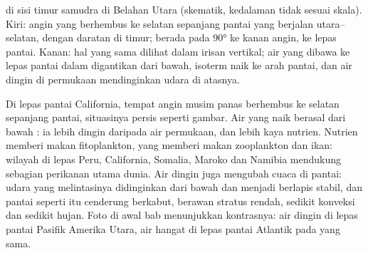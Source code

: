 \begin{omfigure}

{\small {} di sisi timur samudra di Belahan Utara (skematik, kedalaman tidak sesuai skala). Kiri: angin yang berhembus ke selatan sepanjang pantai yang berjalan utara--selatan, dengan daratan di timur;  berada pada \ang{90} ke kanan angin, ke lepas pantai. Kanan: hal yang sama dilihat dalam irisan vertikal; air yang dibawa ke lepas pantai dalam  digantikan dari bawah, isoterm naik ke arah pantai, dan air dingin di permukaan mendinginkan udara di atasnya.}
\label{fig:b1:ocean-circulation:upwelling}
\end{omfigure}

Di lepas pantai California, tempat angin musim panas berhembus ke selatan sepanjang pantai, situasinya persis seperti gambar. Air yang naik berasal dari bawah : ia lebih dingin daripada air permukaan, dan lebih kaya nutrien. Nutrien memberi makan fitoplankton, yang memberi makan zooplankton dan ikan: wilayah  di lepas Peru, California, Somalia, Maroko dan Namibia mendukung sebagian perikanan utama dunia. Air dingin juga mengubah cuaca di pantai: udara yang melintasinya didinginkan dari bawah dan menjadi berlapis stabil, dan pantai seperti itu cenderung berkabut, berawan stratus rendah, sedikit konveksi dan sedikit hujan. Foto di awal bab menunjukkan kontrasnya: air dingin di lepas pantai Pasifik Amerika Utara, air hangat di lepas pantai Atlantik pada  yang sama.

